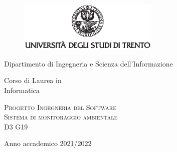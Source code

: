 \pagestyle{plain}
\thispagestyle{empty}

\graphicspath{{assets/figures/}}

\begin{center}
	\begin{figure}[h!]
		\centerline{\includegraphics[width=0.6\textwidth]{Img/logo_unitn_black_center.eps}}
	\end{figure}

	\vspace{2 cm}

	\LARGE{Dipartimento di Ingegneria e Scienza dell’Informazione}

	\vspace{1 cm}

	\Large{
		Corso di Laurea in\\
		Informatica
	}

	\vspace{2 cm}
	\Large\textsc{Progetto Ingegneria del Software\\}
	\vspace{1 cm}
	\Huge\textsc{Sistema di monitoraggio ambientale\\}
	\vspace{1cm}
	\Large{D3 G19}

	\vspace{4cm}

	\Large{Anno accademico 2021/2022}
\end{center}